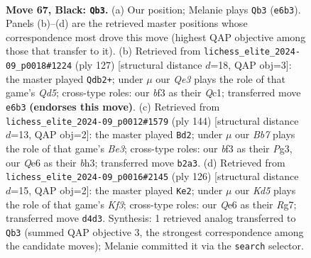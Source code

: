 \documentclass[11pt]{article}
\begin{document}
\clearpage

\begin{figure}[p]\centering
\begin{subfigure}{0.46\textwidth}\centering
\resizebox{\linewidth}{!}{%
\newchessgame
\chessboard[
  setfen={8/8/4q3/7R/1p1k4/5BK1/1b6/8 b - - 25 67},
  showmover=false,
  pgfstyle=straightmove, color=movearrow, markmove={e6-b3}
]}
\caption{}
\end{subfigure}\hfill
\begin{subfigure}{0.46\textwidth}\centering
\resizebox{\linewidth}{!}{%
\newchessgame
\chessboard[
  setfen={1K6/4R3/6k1/5b2/3q4/8/8/2q5 b - - 5 64},
  showmover=false,
  pgfstyle=straightmove, color=movearrow, markmove={d4-b2}
]}
\caption{}
\end{subfigure}
\\[4pt]
\begin{subfigure}{0.46\textwidth}\centering
\resizebox{\linewidth}{!}{%
\newchessgame
\chessboard[
  setfen={8/8/4k3/2K5/8/P3B1Pb/8/7r w - - 4 73},
  showmover=false,
  pgfstyle=straightmove, color=movearrow, markmove={e3-d2}
]}
\caption{}
\end{subfigure}\hfill
\begin{subfigure}{0.46\textwidth}\centering
\resizebox{\linewidth}{!}{%
\newchessgame
\chessboard[
  setfen={8/6R1/2k5/2b5/3r4/5K2/8/8 w - - 34 64},
  showmover=false,
  pgfstyle=straightmove, color=movearrow, markmove={f3-e2}
]}
\caption{}
\end{subfigure}
\caption{\textbf{Move 67, Black: \texttt{Qb3}.} (a) Our position; Melanie plays \texttt{Qb3} (\texttt{e6b3}). Panels (b)--(d) are the retrieved master positions whose correspondence most drove this move (highest QAP objective among those that transfer to it). (b) Retrieved from \texttt{lichess\_elite\_2024-09\_p0018\#1224} (ply 127) [structural distance $d$=18, QAP obj=3]: the master played \texttt{Qdb2+}; under $\mu$ our \emph{Qe3} plays the role of that game's \emph{Qd5}; cross-type roles: our \emph{b}f3 as their \emph{Q}c1; transferred move \texttt{e6b3} \textbf{(endorses this move)}. (c) Retrieved from \texttt{lichess\_elite\_2024-09\_p0012\#1579} (ply 144) [structural distance $d$=13, QAP obj=2]: the master played \texttt{Bd2}; under $\mu$ our \emph{Bb7} plays the role of that game's \emph{Be3}; cross-type roles: our \emph{b}f3 as their \emph{P}g3, our \emph{Q}e6 as their \emph{b}h3; transferred move \texttt{b2a3}. (d) Retrieved from \texttt{lichess\_elite\_2024-09\_p0016\#2145} (ply 126) [structural distance $d$=15, QAP obj=2]: the master played \texttt{Ke2}; under $\mu$ our \emph{Kd5} plays the role of that game's \emph{Kf3}; cross-type roles: our \emph{Q}e6 as their \emph{R}g7; transferred move \texttt{d4d3}. Synthesis: 1 retrieved analog transferred to \texttt{Qb3} (summed QAP objective 3, the strongest correspondence among the candidate moves); Melanie committed it via the \texttt{search} selector.}
\label{fig:thought-m133}
\end{figure}
\end{document}
